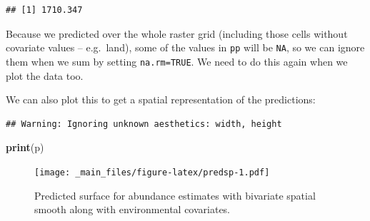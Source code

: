 \documentclass[]{book}
\newenvironment{Shaded}{\begin{snugshade}}{\end{snugshade}}
\newcommand{\KeywordTok}[1]{\textcolor[rgb]{0.13,0.29,0.53}{\textbf{#1}}}
\newcommand{\DataTypeTok}[1]{\textcolor[rgb]{0.13,0.29,0.53}{#1}}
\newcommand{\DecValTok}[1]{\textcolor[rgb]{0.00,0.00,0.81}{#1}}
\newcommand{\StringTok}[1]{\textcolor[rgb]{0.31,0.60,0.02}{#1}}
\newcommand{\CommentTok}[1]{\textcolor[rgb]{0.56,0.35,0.01}{\textit{#1}}}
\newcommand{\OperatorTok}[1]{\textcolor[rgb]{0.81,0.36,0.00}{\textbf{#1}}}
\newcommand{\NormalTok}[1]{#1}
\theoremstyle{definition}
\theoremstyle{definition}
\theoremstyle{remark}
\begin{document}
\begin{verbatim}
## [1] 1710.347
\end{verbatim}

Because we predicted over the whole raster grid (including those cells
without covariate values -- e.g.~land), some of the values in
\texttt{pp} will be \texttt{NA}, so we can ignore them when we sum by
setting \texttt{na.rm=TRUE}. We need to do this again when we plot the
data too.

We can also plot this to get a spatial representation of the
predictions:

\begin{Shaded}
\end{Shaded}

\begin{verbatim}
## Warning: Ignoring unknown aesthetics: width, height
\end{verbatim}

\begin{Shaded}
\begin{Highlighting}[]
\KeywordTok{print}\NormalTok{(p)}
\end{Highlighting}
\end{Shaded}

\begin{figure}
\centering
\texttt{[image: \_main\_files/figure-latex/predsp-1.pdf]}
\caption{\label{fig:predsp}Predicted surface for abundance estimates with
bivariate spatial smooth along with environmental covariates.}
\end{figure}
\end{document}
